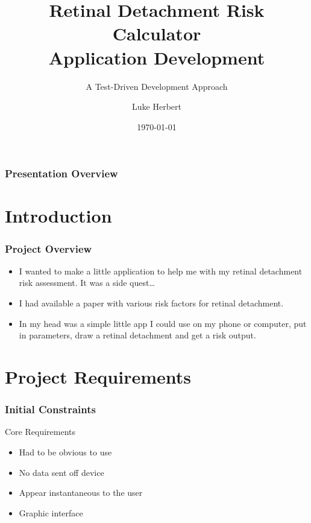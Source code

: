 \documentclass{beamer}
\title{Retinal Detachment Risk Calculator\\Application Development}
\subtitle{A Test-Driven Development Approach}
\author{Luke Herbert}
\date{\today}
\begin{document}
\frame{\titlepage}

\begin{frame}
    \frametitle{Presentation Overview}
    \tableofcontents
\end{frame}

\section{Introduction}
\begin{frame}
    \frametitle{Project Overview}
    \begin{itemize}
        \item I wanted to make a little application to help me with my retinal detachment risk assessment. It was a side quest\dots \pause
        
        \item I had available a paper with various risk factors for retinal detachment. \pause
        
        \item In my head was a simple little app I could use on my phone or computer, put in parameters, draw a retinal detachment and get a risk output. \pause
    \end{itemize}
\end{frame}

\section{Project Requirements}
\begin{frame}
    \frametitle{Initial Constraints}
    \begin{alertblock}{Core Requirements}
        \begin{itemize}
            \item Had to be obvious to use
            \item No data sent off device
            \item Appear instantaneous to the user
            \item Graphic interface
        \end{itemize}
    \end{alertblock}
\end{frame}
\end{document}
